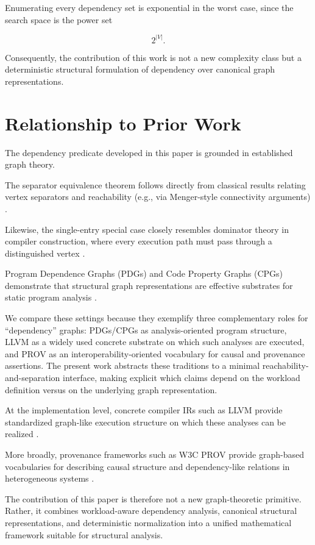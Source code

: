 \documentclass[11pt]{article}
\begin{document}
Enumerating every dependency set is exponential in the worst case,
since the search space is the power set

\[
2^{|V|}.
\]

Consequently, the contribution of this work is not a new complexity
class but a deterministic structural formulation of dependency over
canonical graph representations.
\section{Relationship to Prior Work}

The dependency predicate developed in this paper is grounded in
established graph theory.

The separator equivalence theorem follows directly from classical
results relating vertex separators and reachability (e.g., via Menger-style
connectivity arguments) \cite{menger1927}.

Likewise, the single-entry special case closely resembles dominator
theory in compiler construction, where every execution path must pass
through a distinguished vertex \cite{lengauer1979}.

Program Dependence Graphs (PDGs) and Code Property Graphs (CPGs)
demonstrate that structural graph representations are effective
substrates for static program analysis \cite{ferrante1987,yamaguchi2014cpg}.

We compare these settings because they exemplify three complementary roles for ``dependency'' graphs: PDGs/CPGs as analysis-oriented program structure, LLVM as a widely used concrete substrate on which such analyses are executed, and PROV as an interoperability-oriented vocabulary for causal and provenance assertions. The present work abstracts these traditions to a minimal reachability-and-separation interface, making explicit which claims depend on the workload definition versus on the underlying graph representation.

At the implementation level, concrete compiler IRs such as LLVM provide
standardized graph-like execution structure on which these analyses can be
realized \cite{llvmLangRef}.

More broadly, provenance frameworks such as W3C PROV provide graph-based
vocabularies for describing causal structure and dependency-like relations
in heterogeneous systems \cite{w3cprov}.

The contribution of this paper is therefore not a new graph-theoretic
primitive. Rather, it combines workload-aware dependency analysis,
canonical structural representations, and deterministic normalization
into a unified mathematical framework suitable for structural analysis.
\end{document}
